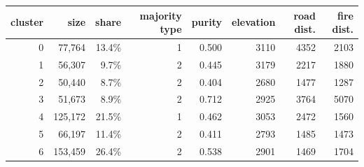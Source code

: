 \begin{tabular}{rrrrrrrr}
\toprule
cluster & size & share & majority type & purity & elevation & road dist. & fire dist.\\
\midrule
0 & 77,764 & 13.4\% & 1 & 0.500 & 3110 & 4352 & 2103\\
1 & 56,307 & 9.7\% & 2 & 0.445 & 3179 & 2217 & 1880\\
2 & 50,440 & 8.7\% & 2 & 0.404 & 2680 & 1477 & 1287\\
3 & 51,673 & 8.9\% & 2 & 0.712 & 2925 & 3764 & 5070\\
4 & 125,172 & 21.5\% & 1 & 0.462 & 3053 & 2472 & 1560\\
5 & 66,197 & 11.4\% & 2 & 0.411 & 2793 & 1485 & 1473\\
6 & 153,459 & 26.4\% & 2 & 0.538 & 2901 & 1469 & 1704\\
\bottomrule
\end{tabular}
